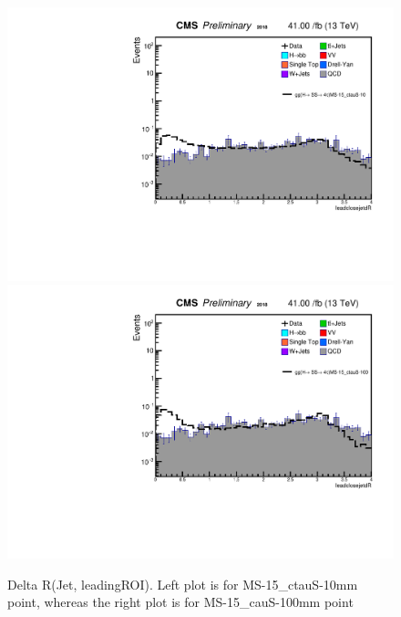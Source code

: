  \begin{figure}[h!]
   \caption{Delta R(Jet, leadingROI). Left plot is for MS-15\_ctauS-10mm point, whereas the right plot is for MS-15\_cauS-100mm point}
   \label{fig:ANleadSize}
   \centering
   \includegraphics[width=0.47\linewidth]{figs/AnalysisNoteplot_MS-15_ctauS-10_leadclosejetdR.pdf}
   \includegraphics[width=0.47\linewidth]{figs/AnalysisNoteplot_MS-15_ctauS-100_leadclosejetdR.pdf}
 \end{figure}


